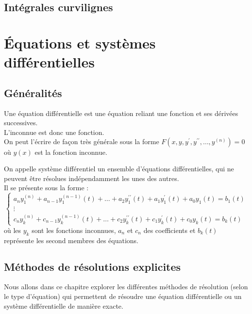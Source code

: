 \chapter{Intégrales curvilignes}




\part{Équations et systèmes différentielles}
\chapter{Généralités}

\begin{defi}
Une équation différentielle est une équation reliant une fonction et ses dérivées successives.\\
L'inconnue est donc une fonction.\\
On peut l'écrire de façon très générale sous la forme $F(x,y,y^{\prime},y^{\prime\prime},\hdots,y^{(n)})=0$ où $y(x)$ est la fonction inconnue.
\end{defi}
\begin{defi}
On appelle système différentiel un ensemble d'équations différentielles, qui ne peuvent être résolues indépendamment les unes des autres.\\
Il se présente sous la forme :
$$\begin{cases}
a_n y_1^{(n)}+a_{n-1}y_1^{(n-1)}(t)+\hdots+a_2 y_1^{\prime\prime}(t)+a_1 y_1^{\prime}(t)+a_0y_1(t) = b_1(t)\\
\vdots \\
c_n y_k^{(n)} + c_{n-1}y_k^{(n-1)}(t)+\hdots+c_2 y_k^{\prime\prime}(t)+c_1 y_k^{\prime}(t)+c_0y_k(t) = b_k(t)
\end{cases}$$
où les $y_k$ sont les fonctions inconnues, $a_n$ et $c_n$ des coefficients et $b_k(t)$ représente les second membres des équations.
\end{defi}


\chapter{Méthodes de résolutions explicites}
Nous allons dans ce chapitre explorer les différentes méthodes de résolution (selon le type d'équation) qui permettent de résoudre une équation différentielle ou un système différentielle de manière exacte.
